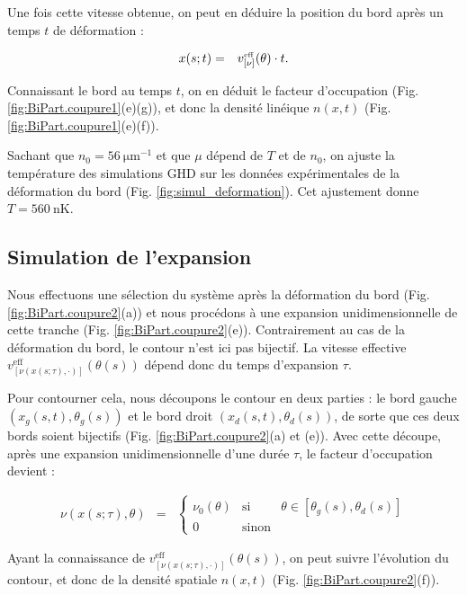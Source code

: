 Une fois cette vitesse obtenue, on peut en déduire la position du bord après un temps $t$ de déformation :

\begin{eqnarray*}
	x(s;t) & = & v_{[\nu]}^{\mbox{\tiny eff}} ( \theta  ) \cdot t.	
\end{eqnarray*}

Connaissant le bord au temps $t$, on en déduit le facteur d’occupation (Fig. \ref{fig:BiPart.coupure1}(e)(g)), et donc la densité linéique $n(x,t)$ (Fig. \ref{fig:BiPart.coupure1}(e)(f)).

Sachant que $n_0 = 56~\mathrm{\mu m}^{-1}$ et que $\mu$ dépend de $T$ et de $n_0$, on ajuste la température des simulations GHD sur les données expérimentales de la déformation du bord (Fig. \ref{fig:simul_deformation}). Cet ajustement donne $T = 560~\mathrm{nK}$.

\subsection{Simulation de l’expansion}

Nous effectuons une sélection du système après la déformation du bord (Fig. \ref{fig:BiPart.coupure2}(a)) et nous procédons à une expansion unidimensionnelle de cette tranche (Fig. \ref{fig:BiPart.coupure2}(e)). Contrairement au cas de la déformation du bord, le contour n’est ici pas bijectif. La vitesse effective $v^{\mathrm{eff}}_{[\nu(x(s;\tau),\cdot)]}(\theta(s))$ dépend donc du temps d’expansion $\tau$.

Pour contourner cela, nous découpons le contour en deux parties : le bord gauche $(x_g(s, t), \theta_g(s))$ et le bord droit $(x_d(s, t), \theta_d(s))$, de sorte que ces deux bords soient bijectifs (Fig. \ref{fig:BiPart.coupure2}(a) et (e)). Avec cette découpe, après une expansion unidimensionnelle d’une durée $\tau$, le facteur d’occupation devient :

\begin{eqnarray*}
	\nu ( x(s;\tau), \theta ) & = & 
	\left\{ 
	\begin{array}{rcl}
	\nu_0(\theta) & \mbox{si} & \theta \in [\theta_g(s), \theta_d(s)] \\
	0 & \mbox{sinon} & 
	\end{array} 
	\right.
\end{eqnarray*}

Ayant la connaissance de $v^{\mathrm{eff}}_{[\nu(x(s;\tau),\cdot)]}(\theta(s))$, on peut suivre l’évolution du contour, et donc de la densité spatiale $n(x,t)$ (Fig. \ref{fig:BiPart.coupure2}(f)). 

